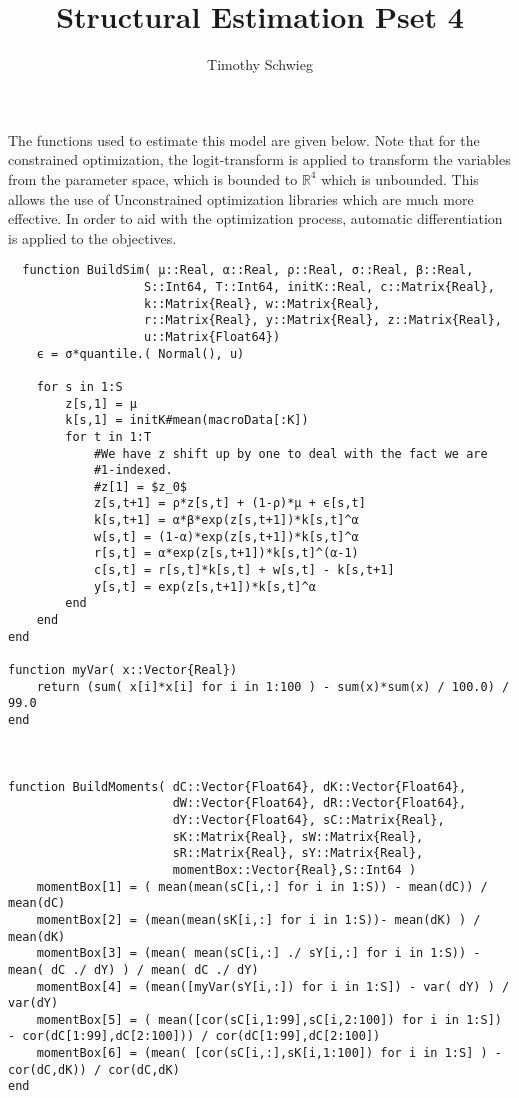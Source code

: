 \documentclass[12pt]{paper}
\title{Structural Estimation Pset 4}
\author{Timothy Schwieg}
\newcommand{\setR}{ \mathbb{R} }
\begin{document}
\maketitle

The functions used to estimate this model are given below. Note that
for the constrained optimization, the logit-transform is applied to
transform the variables from the parameter space, which is bounded to
$\setR^4$ which is unbounded. This allows the use of Unconstrained
optimization libraries which are much more effective. In order to aid
with the optimization process, automatic differentiation is applied to
the objectives.

\begin{verbatim}
  function BuildSim( μ::Real, α::Real, ρ::Real, σ::Real, β::Real,
                   S::Int64, T::Int64, initK::Real, c::Matrix{Real},
                   k::Matrix{Real}, w::Matrix{Real},
                   r::Matrix{Real}, y::Matrix{Real}, z::Matrix{Real},
                   u::Matrix{Float64})
    ϵ = σ*quantile.( Normal(), u)

    for s in 1:S
        z[s,1] = μ
        k[s,1] = initK#mean(macroData[:K])
        for t in 1:T
            #We have z shift up by one to deal with the fact we are
            #1-indexed.
            #z[1] = $z_0$
            z[s,t+1] = ρ*z[s,t] + (1-ρ)*μ + ϵ[s,t]
            k[s,t+1] = α*β*exp(z[s,t+1])*k[s,t]^α
            w[s,t] = (1-α)*exp(z[s,t+1])*k[s,t]^α
            r[s,t] = α*exp(z[s,t+1])*k[s,t]^(α-1)
            c[s,t] = r[s,t]*k[s,t] + w[s,t] - k[s,t+1]
            y[s,t] = exp(z[s,t+1])*k[s,t]^α
        end
    end
end

function myVar( x::Vector{Real})
    return (sum( x[i]*x[i] for i in 1:100 ) - sum(x)*sum(x) / 100.0) / 99.0
end



function BuildMoments( dC::Vector{Float64}, dK::Vector{Float64},
                       dW::Vector{Float64}, dR::Vector{Float64},
                       dY::Vector{Float64}, sC::Matrix{Real},
                       sK::Matrix{Real}, sW::Matrix{Real},
                       sR::Matrix{Real}, sY::Matrix{Real},
                       momentBox::Vector{Real},S::Int64 )
    momentBox[1] = ( mean(mean(sC[i,:] for i in 1:S)) - mean(dC)) / mean(dC)
    momentBox[2] = (mean(mean(sK[i,:] for i in 1:S))- mean(dK) ) / mean(dK)
    momentBox[3] = (mean( mean(sC[i,:] ./ sY[i,:] for i in 1:S)) - mean( dC ./ dY) ) / mean( dC ./ dY)
    momentBox[4] = (mean([myVar(sY[i,:]) for i in 1:S]) - var( dY) ) / var(dY)
    momentBox[5] = ( mean([cor(sC[i,1:99],sC[i,2:100]) for i in 1:S]) - cor(dC[1:99],dC[2:100])) / cor(dC[1:99],dC[2:100])
    momentBox[6] = (mean( [cor(sC[i,:],sK[i,1:100]) for i in 1:S] ) - cor(dC,dK)) / cor(dC,dK)
end





\end{verbatim}
\end{document}
